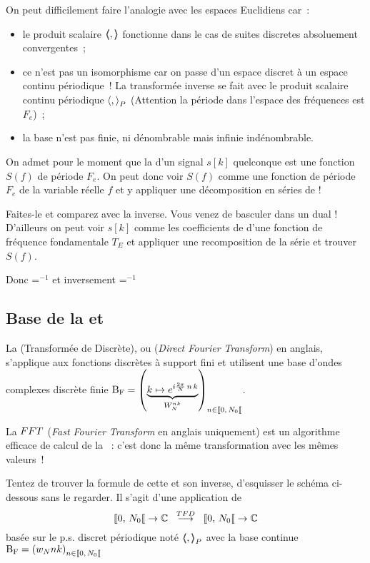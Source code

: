 

On peut difficilement faire l'analogie avec les espaces Euclidiens  car~:
\begin{itemize}
   \item le produit scalaire $\langle\!\!\langle,\rangle\!\!\rangle$ fonctionne dans le cas de suites discretes absoluement convergentes~;
 \item ce n'est pas un isomorphisme car on passe d'un espace discret à un espace continu périodique~! La transformée inverse se fait avec le produit scalaire continu périodique $\langle,{\rangle}_P$ (Attention la période dans l'espace des fréquences est $F_e$)~;
\item la base n'est pas finie, ni dénombrable  mais infinie indénombrable.
\end{itemize}


\begin{exercice}
  On admet pour le moment que la \TFSD{} d'un signal $s[k]$ quelconque est une fonction $S(f)$ de période $F_e$. On peut donc voir $S(f)$ comme une fonction de période $F_e$ de la variable réelle $f$ et y appliquer une décomposition en séries de \Fourier{}!

  Faites-le et comparez avec la \TFSD{} inverse. Vous venez de basculer dans un dual ! D'ailleurs on peut voir $s[k]$ comme les coefficients de \Fourier{} d'une fonction de fréquence fondamentale $T_E$ et appliquer une recomposition de la série et trouver $S(f)$.

  Donc \TFSD{}=\sdf{}$^{-1}$ et inversement \sdf{}=\TFSD{}$^{-1}$
\end{exercice}

\subsection{Base de la \TFD{} et  \FFT{}}

La \TFD{} (Transformée de \Fourier{} Discrète), ou \DFT{} (\emph{Direct Fourier Transform}) en anglais, s'applique aux fonctions discrètes à support fini et utilisent une base d'ondes complexes discrète finie $\Bf=\p{\caCest{k\mapsto e^{i \frac{2 \pi}{N}\,n\,k}}{W_N^{nk}}}_{n\in\SN0}$.

La $FFT{}$ (\emph{Fast Fourier Transform} en anglais uniquement) est un algorithme efficace de calcul de la \TFD{}~: c'est donc la même transformation avec les mêmes valeurs~!

\begin{exercice}
Tentez de trouver la formule de cette \TFD{}  et son inverse, d'esquisser le schéma ci-dessous sans le regarder. Il s'agit d'une application de $$\SN0\rightarrow\C\;\;\operateur{\TFD}\;\;\SN0\rightarrow\C$$ basée sur le p.s. discret périodique noté $\langle\!\!\langle,{\rangle\!\!\rangle}_P$ avec la base continue $\Bf=\p{w_Nnk}_{n\in\SN0}$
\end{exercice}

